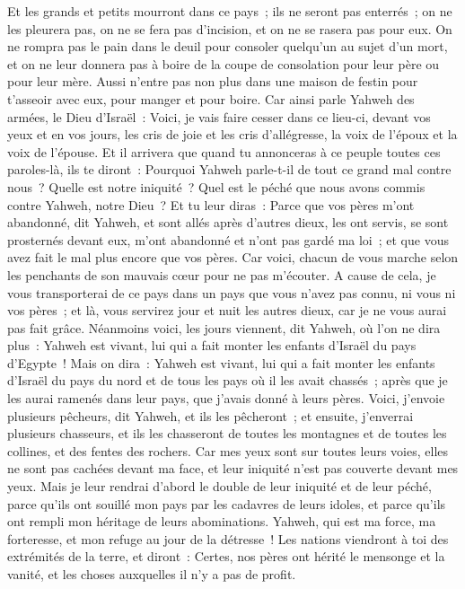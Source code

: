 \begin{multicols}{2}
Et les grands et petits mourront dans ce pays~; ils ne seront pas enterrés~; on ne les pleurera pas, on ne se fera pas d'incision, et on ne se rasera pas pour eux.
On ne rompra pas le pain dans le deuil pour consoler quelqu'un au sujet d'un mort, et on ne leur donnera pas à boire de la coupe de consolation pour leur père ou pour leur mère.
Aussi n'entre pas non plus dans une maison de festin pour t'asseoir avec eux, pour manger et pour boire.
Car ainsi parle Yahweh des armées, le Dieu d'Israël~: Voici, je vais faire cesser dans ce lieu-ci, devant vos yeux et en vos jours, les cris de joie et les cris d'allégresse, la voix de l'époux et la voix de l'épouse.
Et il arrivera que quand tu annonceras à ce peuple toutes ces paroles-là, ils te diront~: Pourquoi Yahweh parle-t-il de tout ce grand mal contre nous~? Quelle est notre iniquité~? Quel est le péché que nous avons commis contre Yahweh, notre Dieu~?
Et tu leur diras~: Parce que vos pères m'ont abandonné, dit Yahweh, et sont allés après d'autres dieux, les ont servis, se sont prosternés devant eux, m'ont abandonné et n'ont pas gardé ma loi~;
et que vous avez fait le mal plus encore que vos pères. Car voici, chacun de vous marche selon les penchants de son mauvais cœur pour ne pas m'écouter.
A cause de cela, je vous transporterai de ce pays dans un pays que vous n'avez pas connu, ni vous ni vos pères~; et là, vous servirez jour et nuit les autres dieux, car je ne vous aurai pas fait grâce.
Néanmoins voici, les jours viennent, dit Yahweh, où l'on ne dira plus~: Yahweh est vivant, lui qui a fait monter les enfants d'Israël du pays d'Egypte~!
Mais on dira~: Yahweh est vivant, lui qui a fait monter les enfants d'Israël du pays du nord et de tous les pays où il les avait chassés~; après que je les aurai ramenés dans leur pays, que j'avais donné à leurs pères.
Voici, j'envoie plusieurs pêcheurs, dit Yahweh, et ils les pêcheront~; et ensuite, j'enverrai plusieurs chasseurs, et ils les chasseront de toutes les montagnes et de toutes les collines, et des fentes des rochers.
Car mes yeux sont sur toutes leurs voies, elles ne sont pas cachées devant ma face, et leur iniquité n'est pas couverte devant mes yeux.
Mais je leur rendrai d'abord le double de leur iniquité et de leur péché, parce qu'ils ont souillé mon pays par les cadavres de leurs idoles, et parce qu'ils ont rempli mon héritage de leurs abominations.
Yahweh, qui est ma force, ma forteresse, et mon refuge au jour de la détresse~! Les nations viendront à toi des extrémités de la terre, et diront~: Certes, nos pères ont hérité le mensonge et la vanité, et les choses auxquelles il n'y a pas de profit.

\end{multicols}
